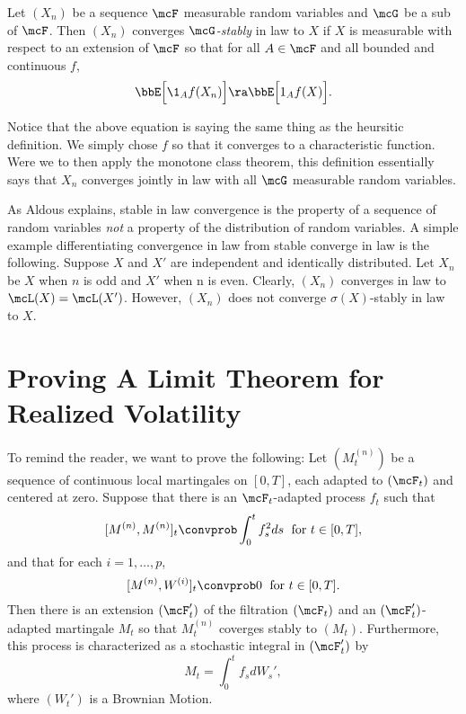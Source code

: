 \documentclass{report}
\begin{document}
\begin{definition}
Let $(X_n)$ be a sequence $\mcF$ measurable random variables and
$\mcG$ be a sub \sigalg of $\mcF$.  Then $(X_n)$ converges
\emph{$\mcG$-stably} in law to $X$ if $X$ is measurable with respect
to an extension of $\mcF$ so that for all $A \in \mcF$ and all bounded
and continuous $f$, 
\[
\bbE \Big[ \1_A f(X_n) \Big] \ra \bbE \Big[ 1_A f(X) \Big].
\]

\end{definition}

Notice that the above equation is saying the same thing as the
heursitic definition.  We simply chose $f$ so that it converges to a
characteristic function.  Were we to then apply the monotone class
theorem, this definition essentially says that $X_n$ converges jointly
in law with all $\mcG$ measurable random variables.  

As Aldous explains, stable in law convergence is the property of a
sequence of random variables \emph{not} a property of the distribution
of random variables.  A simple example differentiating convergence in
law from stable converge in law is the following.  Suppose $X$ and
$X'$ are independent and identically distributed.  Let $X_n$ be $X$
when $n$ is odd and $X'$ when n is even.  Clearly, $(X_n)$ converges
in law to $\mcL(X) = \mcL(X')$.  However, $(X_n)$ does not converge
$\sigma(X)$-stably in law to $X$.

\section{Proving A Limit Theorem for Realized Volatility}

To remind the reader, we want to prove the following:  Let
$(M^{(n)}_t)$ be a sequence of continuous local martingales on
$[0,T]$, each adapted to $(\mcF_t)$ and centered at zero.  Suppose
that there is an $\mcF_t$-adapted process $f_t$ such that
\[
[M^{(n)},M^{(n)}]_t \convprob \int_0^t f_s^2 ds \; \textmd{ for } t
\in [0,T],
\]
and that for each $i = 1, \ldots , p$,
\[
[M^{(n)}, W^{(i)}]_t \convprob 0 \; \textmd{ for } t \in [0,T].
\]
Then there is an extension $(\mcF'_t)$ of the filtration $(\mcF_t)$
and an $(\mcF'_t)$-adapted martingale $M_t$ so that $M^{(n)}_t$
coverges stably to $(M_t)$.  Furthermore, this process is
characterized as a stochastic integral in $(\mcF'_t)$ by
\[
M_t = \int_0^t f_s dW_s',
\]
where $(W_t')$ is a Brownian Motion.
\end{document}
